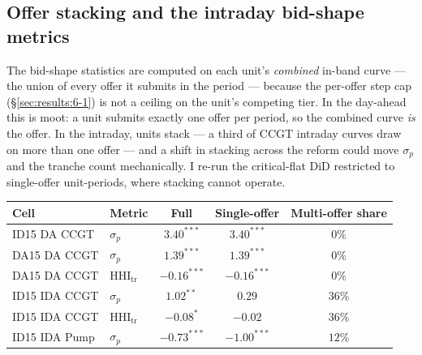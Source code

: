\documentclass[11pt,a4paper]{article}
\theoremstyle{definition}
\theoremstyle{remark}
\theoremstyle{plain}
\begin{document}
\subsection{Offer stacking and the intraday bid-shape metrics}\label{app:offer-stacking}

The bid-shape statistics are computed on each unit's \emph{combined} in-band curve --- the union of every offer it submits in the period --- because the per-offer step cap (\S\ref{sec:results:6-1}) is not a ceiling on the unit's competing tier. In the day-ahead this is moot: a unit submits exactly one offer per period, so the combined curve \emph{is} the offer. In the intraday, units stack --- a third of CCGT intraday curves draw on more than one offer --- and a shift in stacking across the reform could move $\sigma_p$ and the tranche count mechanically. I re-run the critical-flat DiD restricted to single-offer unit-periods, where stacking cannot operate.

\begin{center}
\footnotesize
\setlength{\tabcolsep}{7pt}
\begin{tabular}{l l c c c}
\toprule
\textbf{Cell} & \textbf{Metric} & \textbf{Full} & \textbf{Single-offer} & \textbf{Multi-offer share} \\
\midrule
ID15 DA CCGT  & $\sigma_p$               & $3.40^{***}$ & $3.40^{***}$ & $0\%$ \\
DA15 DA CCGT  & $\sigma_p$               & $1.39^{***}$ & $1.39^{***}$ & $0\%$ \\
DA15 DA CCGT  & $\text{HHI}_{\text{tr}}$ & $-0.16^{***}$ & $-0.16^{***}$ & $0\%$ \\
ID15 IDA CCGT & $\sigma_p$               & $1.02^{**}$  & $0.29$       & $36\%$ \\
ID15 IDA CCGT & $\text{HHI}_{\text{tr}}$ & $-0.08^{*}$  & $-0.02$       & $36\%$ \\
ID15 IDA Pump & $\sigma_p$               & $-0.73^{***}$ & $-1.00^{***}$ & $12\%$ \\
\bottomrule
\end{tabular}
\label{tab:offer-stacking}
\end{center}
\end{document}
